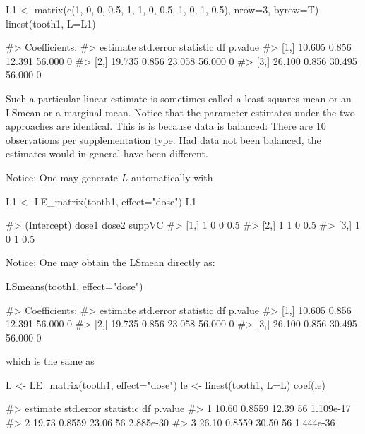 \begin{Schunk}
\begin{Sinput}
L1 <- matrix(c(1, 0, 0, 0.5, 
               1, 1, 0, 0.5,
               1, 0, 1, 0.5), nrow=3, byrow=T)
linest(tooth1, L=L1)
\end{Sinput}
\begin{Soutput}
#> Coefficients:
#>      estimate std.error statistic     df p.value
#> [1,]   10.605     0.856    12.391 56.000       0
#> [2,]   19.735     0.856    23.058 56.000       0
#> [3,]   26.100     0.856    30.495 56.000       0
\end{Soutput}
\end{Schunk}

Such a particular linear estimate is sometimes called a least-squares
mean or an LSmean or a marginal mean. Notice that the parameter
estimates under the two approaches are identical. This is is because
data is balanced: There are \(10\) observations per supplementation
type. Had data not been balanced, the estimates would in general have
been different.

Notice: One may generate \(L\) automatically with

\begin{Schunk}
\begin{Sinput}
L1 <- LE_matrix(tooth1, effect="dose")
L1
\end{Sinput}
\begin{Soutput}
#>      (Intercept) dose1 dose2 suppVC
#> [1,]           1     0     0    0.5
#> [2,]           1     1     0    0.5
#> [3,]           1     0     1    0.5
\end{Soutput}
\end{Schunk}

Notice: One may obtain the LSmean directly as:

\begin{Schunk}
\begin{Sinput}
LSmeans(tooth1, effect="dose")
\end{Sinput}
\begin{Soutput}
#> Coefficients:
#>      estimate std.error statistic     df p.value
#> [1,]   10.605     0.856    12.391 56.000       0
#> [2,]   19.735     0.856    23.058 56.000       0
#> [3,]   26.100     0.856    30.495 56.000       0
\end{Soutput}
\end{Schunk}

which is the same as

\begin{Schunk}
\begin{Sinput}
L <- LE_matrix(tooth1, effect="dose")
le <- linest(tooth1, L=L)
coef(le)
\end{Sinput}
\begin{Soutput}
#>   estimate std.error statistic df   p.value
#> 1    10.60    0.8559     12.39 56 1.109e-17
#> 2    19.73    0.8559     23.06 56 2.885e-30
#> 3    26.10    0.8559     30.50 56 1.444e-36
\end{Soutput}
\end{Schunk}

